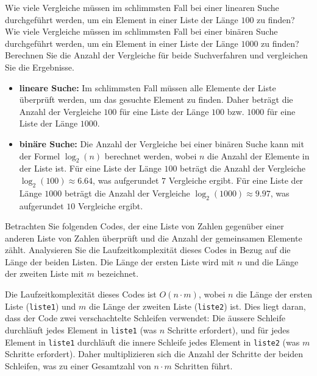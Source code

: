 \begin{mychallenge}
	Wie viele Vergleiche müssen im schlimmsten Fall bei einer linearen Suche durchgeführt werden, um ein Element in einer Liste der Länge \(100\) zu finden? Wie viele Vergleiche müssen im schlimmsten Fall bei einer binären Suche durchgeführt werden, um ein Element in einer Liste der Länge \(1000\) zu finden? Berechnen Sie die Anzahl der Vergleiche für beide Suchverfahren und vergleichen Sie die Ergebnisse.
	\begin{myanswer}
		\begin{itemize}
			\item \textbf{lineare Suche:} Im schlimmsten Fall müssen alle Elemente der Liste überprüft werden, um das gesuchte Element zu finden. Daher beträgt die Anzahl der Vergleiche \(100\) für eine Liste der Länge \(100\) bzw. \(1000\) für eine Liste der Länge \(1000\).
			\item \textbf{binäre Suche:} Die Anzahl der Vergleiche bei einer binären Suche kann mit der Formel \(\log_2(n)\) berechnet werden, wobei \(n\) die Anzahl der Elemente in der Liste ist. Für eine Liste der Länge \(100\) beträgt die Anzahl der Vergleiche \(\log_2(100) \approx 6.64\), was aufgerundet \(7\) Vergleiche ergibt. Für eine Liste der Länge \(1000\) beträgt die Anzahl der Vergleiche \(\log_2(1000) \approx 9.97\), was aufgerundet \(10\) Vergleiche ergibt.
		\end{itemize}
	\end{myanswer}
\end{mychallenge}

\begin{mychallenge}
	Betrachten Sie folgenden Codes, der eine Liste von Zahlen gegenüber einer anderen Liste von Zahlen überprüft und die Anzahl der gemeinsamen Elemente zählt. Analysieren Sie die Laufzeitkomplexität dieses Codes in Bezug auf die Länge der beiden Listen. Die Länge der ersten Liste wird mit \(n\) und die Länge der zweiten Liste mit \(m\) bezeichnet.
	
	\begin{myanswer}
		Die Laufzeitkomplexität dieses Codes ist \(O(n \cdot m)\), wobei \(n\) die Länge der ersten Liste (\lstinline|liste1|) und \(m\) die Länge der zweiten Liste (\lstinline|liste2|) ist. Dies liegt daran, dass der Code zwei verschachtelte Schleifen verwendet: Die äussere Schleife durchläuft jedes Element in \lstinline|liste1| (was \(n\) Schritte erfordert), und für jedes Element in \lstinline|liste1| durchläuft die innere Schleife jedes Element in \lstinline|liste2| (was \(m\) Schritte erfordert). Daher multiplizieren sich die Anzahl der Schritte der beiden Schleifen, was zu einer Gesamtzahl von \(n \cdot m\) Schritten führt.
	\end{myanswer}
\end{mychallenge}

